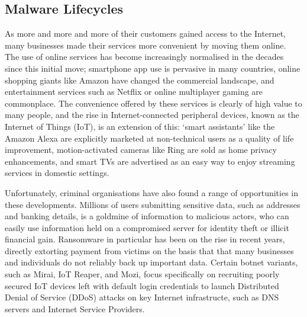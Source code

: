 \documentclass[10pt,sigconf]{acmart}
\begin{document}
\subsection{Malware Lifecycles}

As more and more and more of their customers gained access to the Internet, many businesses made their services more convenient by moving them online.
The use of online services has become increasingly normalised in the decades since this initial move;
smartphone app use is pervasive in many countries, online shopping giants like Amazon have changed the commercial landscape, and entertainment services such as Netflix or online multiplayer gaming are commonplace.
The convenience offered by these services is clearly of high value to many people, and the rise in Internet-connected peripheral devices, known as the Internet of Things (IoT), is an extension of this:
`smart assistants' like the Amazon Alexa are explicitly marketed at non-technical users as a quality of life improvement, motion-activated cameras like Ring are sold as home privacy enhancements, and smart TVs are advertised as an easy way to enjoy streaming services in domestic settings.

Unfortunately, criminal organisations have also found a range of opportunities in these developments.
Millions of users submitting sensitive data, such as addresses and banking details, is a goldmine of information to malicious actors, who can easily use information held on a compromised server for identity theft or illicit financial gain.
Ransomware in particular has been on the rise in recent years, directly extorting payment from victims on the basis that that many businesses and individuals do not reliably back up important data.
Certain botnet variants, such as Mirai, IoT Reaper, and Mozi, focus specifically on recruiting poorly secured IoT devices left with default login credentials to launch Distributed Denial of Service (DDoS) attacks on key Internet infrastructe, such as DNS servers and Internet Service Providers.
\end{document}

